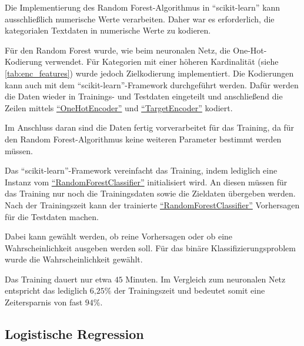 Die Implementierung des Random Forest-Algorithmus in \enquote{scikit-learn} kann ausschließlich numerische Werte verarbeiten.  
Daher war es erforderlich, die kategorialen Textdaten in numerische Werte zu kodieren.

Für den Random Forest wurde, wie beim neuronalen Netz, die One-Hot-Kodierung verwendet.  
Für Kategorien mit einer höheren Kardinalität (siehe \ref{tab:enc_features}) wurde jedoch Zielkodierung implementiert.
Die Kodierungen kann auch mit dem \enquote{scikit-learn}-Framework durchgeführt werden. 
Dafür werden die Daten wieder in Trainings- und Testdaten eingeteilt und anschließend die Zeilen mittels \href{https://scikit-learn.org/stable/modules/generated/sklearn.preprocessing.OneHotEncoder.html}{\enquote{OneHotEncoder}} und \href{https://scikit-learn.org/stable/modules/generated/sklearn.preprocessing.TargetEncoder.html}{\enquote{TargetEncoder}} kodiert.

Im Anschluss daran sind die Daten fertig vorverarbeitet für das Training, da für den Random Forest-Algorithmus keine weiteren Parameter bestimmt werden müssen. 

Das \enquote{scikit-learn}-Framework vereinfacht das Training, indem lediglich eine Instanz vom \href{https://scikit-learn.org/stable/modules/generated/sklearn.ensemble.RandomForestClassifier.html}{\enquote{RandomForestClassifier}} initialisiert wird. An diesen müssen für das Training nur noch die Trainingsdaten sowie die Zieldaten übergeben werden.
Nach der Trainingszeit kann der trainierte \href{https://scikit-learn.org/stable/modules/generated/sklearn.ensemble.RandomForestClassifier.html}{\enquote{RandomForestClassifier}} Vorhersagen für die Testdaten machen.

Dabei kann gewählt werden, ob reine Vorhersagen oder ob eine Wahrscheinlichkeit ausgeben werden soll. 
Für das binäre Klassifizierungsproblem wurde die Wahrscheinlichkeit gewählt.

Das Training dauert nur etwa $45$ Minuten. Im Vergleich zum neuronalen Netz entspricht das lediglich $6\text{,}25\%$ der Trainingszeit und bedeutet somit eine Zeitersparnis von fast $94\%$.

\subsection{Logistische Regression}
\label{sec:impl_log_reg}


